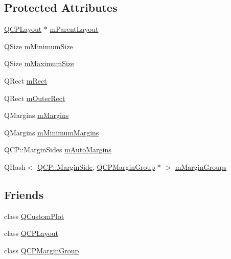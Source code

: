 \subsection*{Protected Attributes}
\begin{DoxyCompactItemize}
\item 
\hyperlink{class_q_c_p_layout}{Q\+C\+P\+Layout} $\ast$ \hyperlink{class_q_c_p_layout_element_ae7c75c25549608bd688bdb65d4c38066}{m\+Parent\+Layout}
\item 
Q\+Size \hyperlink{class_q_c_p_layout_element_affef747c81632de33f08483b7fd10d01}{m\+Minimum\+Size}
\item 
Q\+Size \hyperlink{class_q_c_p_layout_element_a64a387973fd4addac842028c89088998}{m\+Maximum\+Size}
\item 
Q\+Rect \hyperlink{class_q_c_p_layout_element_ad8896f05550389f7b9e92c9e6cdf6e01}{m\+Rect}
\item 
Q\+Rect \hyperlink{class_q_c_p_layout_element_a07bb4973379e75cb0fa5b032c1d24afd}{m\+Outer\+Rect}
\item 
Q\+Margins \hyperlink{class_q_c_p_layout_element_ac2a32b99ee527ca5dfff9da03628fe94}{m\+Margins}
\item 
Q\+Margins \hyperlink{class_q_c_p_layout_element_a5ba71f25d1af4bb092b28df618538e63}{m\+Minimum\+Margins}
\item 
Q\+C\+P\+::\+Margin\+Sides \hyperlink{class_q_c_p_layout_element_af61c70354d1275778d68206b2a1b2d36}{m\+Auto\+Margins}
\item 
Q\+Hash$<$ \hyperlink{namespace_q_c_p_a7e487e3e2ccb62ab7771065bab7cae54}{Q\+C\+P\+::\+Margin\+Side}, \hyperlink{class_q_c_p_margin_group}{Q\+C\+P\+Margin\+Group} $\ast$ $>$ \hyperlink{class_q_c_p_layout_element_ae027b5caf347c2fb635e797513712a32}{m\+Margin\+Groups}
\end{DoxyCompactItemize}
\subsection*{Friends}
\begin{DoxyCompactItemize}
\item 
class \hyperlink{class_q_c_p_layout_element_a1cdf9df76adcfae45261690aa0ca2198}{Q\+Custom\+Plot}
\item 
class \hyperlink{class_q_c_p_layout_element_a588aac0a0d721f6c5f10126d8596a20f}{Q\+C\+P\+Layout}
\item 
class \hyperlink{class_q_c_p_layout_element_ad077a686e85ab6fa03dcb2fd37fc499a}{Q\+C\+P\+Margin\+Group}
\end{DoxyCompactItemize}
